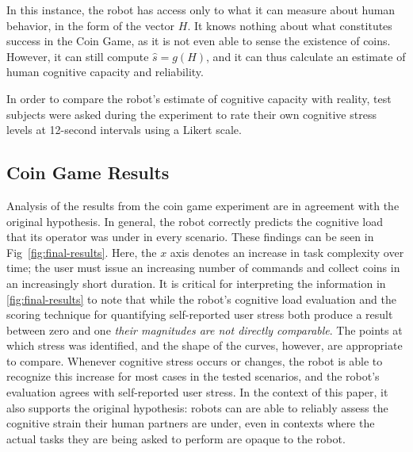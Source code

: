 \documentclass{sig-alternate}
\begin{document}
In this instance, the robot has access only to what it can measure
about human behavior, in the form of the vector $H$.  It knows nothing
about what constitutes success in the Coin Game, as it is not even
able to sense the existence of coins.  However, it can still compute
$\hat{s} = g(H)$, and it can thus calculate an estimate of human
cognitive capacity and reliability.

In order to compare the robot's estimate of cognitive capacity with
reality, test subjects were asked during the experiment to rate their
own cognitive stress levels at 12-second intervals using a Likert
scale.


\subsection{Coin Game Results}

Analysis of the results from the coin game experiment are in agreement
with the original hypothesis. In general, the robot correctly predicts
the cognitive load that its operator was under in every
scenario. These findings can be seen in Fig~\ref{fig:final-results}.
Here, the $x$ axis denotes an increase in task complexity over time;
the user must issue an increasing number of commands and collect coins
in an increasingly short duration. It is critical for interpreting the
information in \ref{fig:final-results} to note that while the robot's
cognitive load evaluation and the scoring technique for quantifying
self-reported user stress both produce a result between zero and one
\textit{their magnitudes are not directly comparable}.  The points at
which stress was identified, and the shape of the curves, however, are
appropriate to compare.  Whenever cognitive stress occurs or changes,
the robot is able to recognize this increase for most cases in the
tested scenarios, and the robot's evaluation agrees with self-reported
user stress.  In the context of this paper, it also supports the
original hypothesis: robots can are able to reliably assess the
cognitive strain their human partners are under, even in contexts
where the actual tasks they are being asked to perform are opaque to
the robot.
\end{document}
